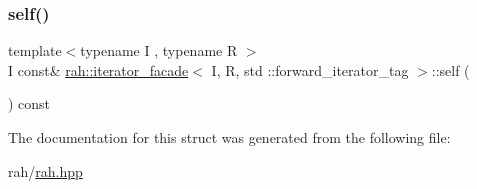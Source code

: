 \mbox{\label{structrah_1_1iterator__facade_3_01_i_00_01_r_00_01std_01_1_1forward__iterator__tag_01_4_addc54ad790aa07a1467e3e4a50d60864}} 
\subsubsection{\texorpdfstring{self()}{self()}\hspace{0.1cm}{\footnotesize\ttfamily [2/2]}}
{\footnotesize\ttfamily template$<$typename I , typename R $>$ \\
I const\& \mbox{\hyperlink{structrah_1_1iterator__facade}{rah\+::iterator\+\_\+facade}}$<$ I, R, std \+::forward\+\_\+iterator\+\_\+tag $>$\+::self (\begin{DoxyParamCaption}{ }\end{DoxyParamCaption}) const\hspace{0.3cm}{\ttfamily [inline]}}



The documentation for this struct was generated from the following file\+:\begin{DoxyCompactItemize}
\item 
rah/\mbox{\hyperlink{rah_8hpp}{rah.\+hpp}}\end{DoxyCompactItemize}
